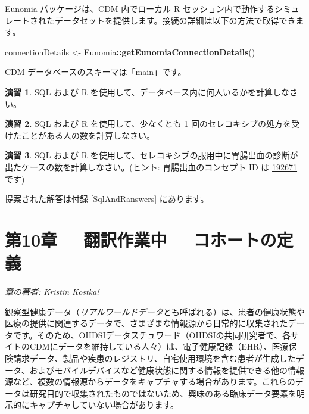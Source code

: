 \documentclass[
  11pt]{book}
\newenvironment{Shaded}{\begin{snugshade}}{\end{snugshade}}
\newcommand{\FunctionTok}[1]{\textcolor[rgb]{0.13,0.29,0.53}{\textbf{#1}}}
\newcommand{\NormalTok}[1]{#1}
\newcommand{\OtherTok}[1]{\textcolor[rgb]{0.56,0.35,0.01}{#1}}
\newcommand{\SpecialCharTok}[1]{\textcolor[rgb]{0.81,0.36,0.00}{\textbf{#1}}}
\theoremstyle{definition}
\theoremstyle{definition}
\theoremstyle{definition}
\newtheorem{exercise}{演習}[chapter]
\theoremstyle{definition}
\theoremstyle{remark}
\begin{document}
Eunomia パッケージは、CDM 内でローカル R セッション内で動作するシミュレートされたデータセットを提供します。接続の詳細は以下の方法で取得できます。

\begin{Shaded}
\begin{Highlighting}[]
\NormalTok{connectionDetails }\OtherTok{\textless{}{-}}\NormalTok{ Eunomia}\SpecialCharTok{::}\FunctionTok{getEunomiaConnectionDetails}\NormalTok{()}
\end{Highlighting}
\end{Shaded}

CDM データベースのスキーマは「main」です。

\begin{exercise}
\protect\hypertarget{exr:exercisePeopleCount}{}\label{exr:exercisePeopleCount}SQL および R を使用して、データベース内に何人いるかを計算しなさい。
\end{exercise}

\begin{exercise}
\protect\hypertarget{exr:exerciseCelecoxibUsers}{}\label{exr:exerciseCelecoxibUsers}SQL および R を使用して、少なくとも 1 回のセレコキシブの処方を受けたことがある人の数を計算しなさい。
\end{exercise}

\begin{exercise}
\protect\hypertarget{exr:exerciseGiBleedsDuringCelecoxib}{}\label{exr:exerciseGiBleedsDuringCelecoxib}SQL および R を使用して、セレコキシブの服用中に胃腸出血の診断が出たケースの数を計算しなさい。(ヒント: 胃腸出血のコンセプト ID は \href{http://athena.ohdsi.org/search-terms/terms/192671}{192671} です)
\end{exercise}

提案された解答は付録 \ref{SqlAndRanswers} にあります。

\chapter{第10章　--翻訳作業中--　コホートの定義}\label{Cohorts}

\emph{章の著者: Kristin Kostka!}

観察型健康データ（\emph{リアルワールドデータ}とも呼ばれる）は、患者の健康状態や医療の提供に関連するデータで、さまざまな情報源から日常的に収集されたデータです。そのため、OHDSIデータスチュワード（OHDSIの共同研究者で、各サイトのCDMにデータを維持している人々）は、電子健康記録（EHR）、医療保険請求データ、製品や疾患のレジストリ、自宅使用環境を含む患者が生成したデータ、およびモバイルデバイスなど健康状態に関する情報を提供できる他の情報源など、複数の情報源からデータをキャプチャする場合があります。これらのデータは研究目的で収集されたものではないため、興味のある臨床データ要素を明示的にキャプチャしていない場合があります。
\end{document}
